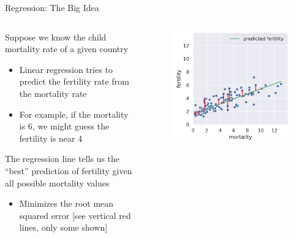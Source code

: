 \documentclass[aspectratio=169]{../latex_main/tntbeamer}  %
\begin{document}
	
	\begin{frame}{Regression: The Big Idea}
	    \begin{columns}
	        \begin{column}{.5\textwidth}
	                Suppose we know the child mortality rate of a given country
	                \begin{itemize}
	                    \item Linear regression tries to predict the fertility rate from the mortality rate
	                    \item For example, if the mortality is 6, we might guess the fertility is near 4
	                \end{itemize}
	                \bigskip
	                The regression line tells us the “best” prediction of fertility given all possible mortality values\\
	                \begin{itemize}
	                    \item Minimizes the root mean squared error [see vertical red lines, only some shown]
	                \end{itemize}
	        \end{column}
	        
	        
	        \begin{column}{.5\textwidth}
	                \begin{figure}
	                    \centering
	                    \includegraphics[scale=.5]{Bild20}
	                \end{figure}
	        \end{column}
	        
	        
	    \end{columns}

	\end{frame}
	
\end{document}
